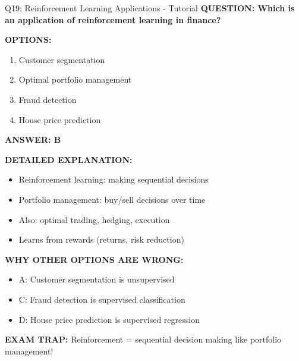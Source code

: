 \documentclass[8pt]{beamer}
\begin{document}
	\begin{frame}{Q19: Reinforcement Learning Applications - Tutorial}
		\fontsize{6.5}{7.5}\selectfont
		\textbf{QUESTION: Which is an application of reinforcement learning in finance?}
		
		\vspace{0.1cm}
		\textbf{OPTIONS:}
		\begin{enumerate}
			\item Customer segmentation
			\item Optimal portfolio management
			\item Fraud detection
			\item House price prediction
		\end{enumerate}
		
		\vspace{0.1cm}
		\textcolor{myblue}{\textbf{ANSWER: B}}
		
		\vspace{0.1cm}
		\textbf{DETAILED EXPLANATION:}
		\begin{itemize}
			\item Reinforcement learning: making sequential decisions
			\item Portfolio management: buy/sell decisions over time
			\item Also: optimal trading, hedging, execution
			\item Learns from rewards (returns, risk reduction)
		\end{itemize}
		
		\vspace{0.1cm}
		\textcolor{myred}{\textbf{WHY OTHER OPTIONS ARE WRONG:}}
		\begin{itemize}
			\item \textcolor{myred}{A:} Customer segmentation is unsupervised
			\item \textcolor{myred}{C:} Fraud detection is supervised classification
			\item \textcolor{myred}{D:} House price prediction is supervised regression
		\end{itemize}
		
		\textcolor{myred}{\textbf{EXAM TRAP:}} Reinforcement = \textcolor{myblue}{sequential decision making} like portfolio management!
	\end{frame}
	
\end{document}
